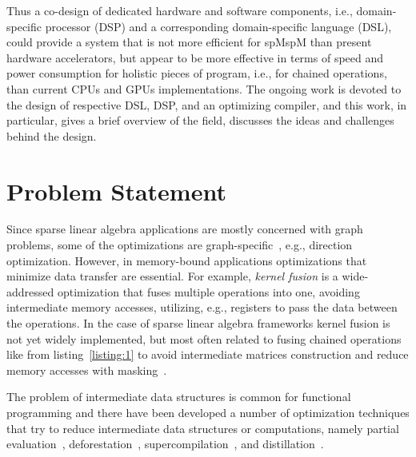 \documentclass[10pt,conference]{IEEEtran}
\begin{document}
Thus a co-design of dedicated hardware and software components, i.e., domain-specific processor (DSP) and a corresponding domain-specific language (DSL), could provide a system that is not more efficient for spMspM than present hardware accelerators, but appear to be more effective in terms of speed and power consumption for holistic pieces of program, i.e., for chained operations, than current CPUs and GPUs implementations.
The ongoing work is devoted to the design of respective DSL, DSP, and an optimizing compiler, and this work, in particular, gives a brief overview of the field, discusses the ideas and challenges behind the design. 


\section{Problem Statement}
Since sparse linear algebra applications are mostly concerned with graph problems, some of the optimizations are graph-specific~\cite{yang2020graphblast,graphIt}, e.g., direction optimization.
However, in memory-bound applications optimizations that minimize data transfer are essential. 
For example, \emph{kernel fusion} is a wide-addressed optimization that fuses multiple operations into one, avoiding intermediate memory accesses, utilizing, e.g., registers to pass the data between the operations.
In the case of sparse linear algebra frameworks kernel fusion is not yet widely implemented, but most often related to fusing chained operations like
from listing~\ref{listing:1} to avoid intermediate matrices construction and reduce memory accesses with masking~\cite{yang2020graphblast}.

The problem of intermediate data structures is common for functional programming
and there have been developed a number of 
optimization techniques that try to reduce intermediate 
data structures or computations, namely partial evaluation~\cite{jones}, deforestation~\cite{WADLER1990231}, supercompilation~\cite{supercompilation}, and distillation~\cite{distillation}.
\end{document}
